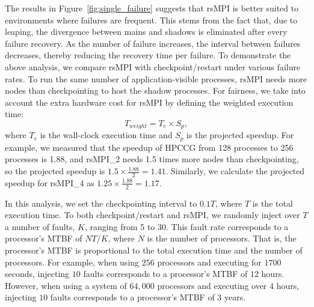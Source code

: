 The results in Figure~\ref{fig:single_failure} suggests that rsMPI is better suited to environments where failures are frequent. 
This stems from the fact that, due to leaping, the divergence between mains and shadows is eliminated after every failure recovery. As the number of failure increases, the interval between failures decreases, thereby reducing the recovery time per failure.
To demonstrate the above analysis, we compare rsMPI with checkpoint/restart under various failure rates. 
To run the same number of application-visible processes, rsMPI needs more nodes than checkpointing to host the shadow processes. 
For fairness, we take into account the extra hardware cost for rsMPI by defining the weighted execution time:
$$T_{weight} = T_e \times S_p,$$ where $T_e$ is the wall-clock execution time and $S_p$ is the projected speedup. For example, we measured that the speedup of HPCCG from 128 processes to 256 processes is 1.88, and rsMPI\_2 needs 1.5 times more nodes than checkpointing, so the projected speedup is $1.5\times\frac{1.88}{2}=1.41$. Similarly, we calculate the projected speedup for rsMPI\_4 as $1.25\times\frac{1.88}{2}=1.17$.




In this analysis, we set the checkpointing interval to $0.1T$, where $T$ is the total execution time. To  both checkpoint/restart and rsMPI, we randomly inject over $T$ a number of faults, $K$, ranging from 5 to 30. This fault rate corresponds to a processor's MTBF of $NT/K$, where $N$ is the number of processors. That is, the processor's MTBF is proportional to the total execution time and the number of processors. For example, when using $256$ processors and executing for $1700$ seconds, injecting $10$ faults corresponds to a processor's MTBF of $12$ hours. However, 
when using a system of $64,000$ processors and executing over $4$ hours, injecting $10$ faults corresponds to a processor's MTBF of $3$ years.

